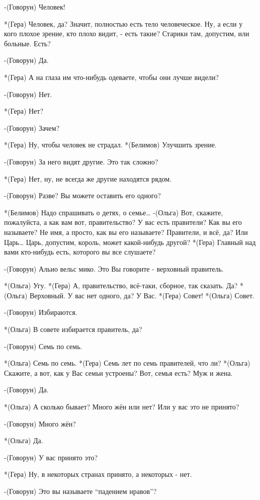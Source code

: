 -(Говорун) Человек!

*(Гера) Человек, да? Значит, полностью есть тело человеческое. Ну, а если у кого плохое зрение, кто плохо видит, -  есть такие? Старики там, допустим, или больные. Есть?

-(Говорун) Да.

*(Гера) А на глаза им что-нибудь одеваете, чтобы они лучше видели?

-(Говорун) Нет.

*(Гера) Нет?

-(Говорун) Зачем?

*(Гера) Ну, чтобы человек не страдал.
*(Белимов) Улучшить зрение.


-(Говорун) За него видят другие. Это так сложно?

*(Гера) Нет, ну, не всегда же другие находятся рядом.

-(Говорун) Разве? Вы можете оставить его одного?

*(Белимов) Надо спрашивать о детях, о семье…
-(Ольга) Вот, скажите, пожалуйста, а как вам вот, правительство? У вас есть правители? Как вы его называете? Не имя, а просто, как вы его называете? Правители, и всё, да? Или Царь… Царь, допустим, король, может какой-нибудь другой?
*(Гера) Главный над вами кто-нибудь есть, которого вы все слушаете?  

-(Говорун) Альио вельс мико. Это Вы говорите - верховный правитель.

*(Ольга) Угу.
*(Гера) А, правительство, всё-таки, сборное, так сказать. Да?
*(Ольга) Верховный. У вас нет одного, да? У Вас.
*(Гера) Совет!
*(Ольга)  Совет.

-(Говорун) Избираются. 

*(Ольга) В совете избирается правитель, да?

-(Говорун) Семь по семь.

*(Ольга) Семь по семь.
*(Гера) Семь лет по семь правителей, что ли?
*(Ольга) Скажите, а вот, как у Вас семьи устроены? Вот, семья есть? Муж и жена.

-(Говорун) Да.

*(Ольга) А сколько бывает? Много жён или нет? Или у вас это не принято?

-(Говорун) Много жён?

*(Ольга) Да.

-(Говорун) У вас принято это?

*(Гера) Ну, в некоторых странах принято, а некоторых - нет.

-(Говорун) Это вы называете “падением нравов”?

